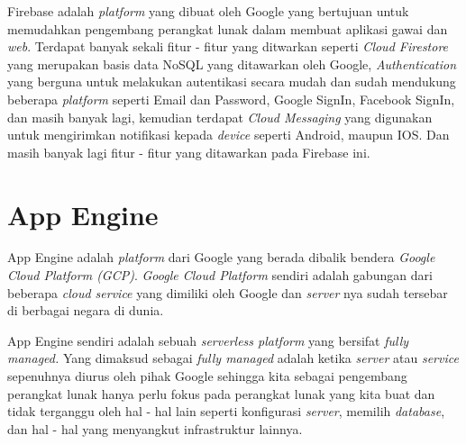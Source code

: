 Firebase adalah \textit{platform} yang dibuat oleh Google yang bertujuan untuk memudahkan pengembang perangkat lunak dalam membuat aplikasi gawai dan \textit{web}. Terdapat banyak sekali fitur - fitur yang ditwarkan seperti \textit{Cloud Firestore} yang merupakan basis data NoSQL yang ditawarkan oleh Google, \textit{Authentication} yang berguna untuk melakukan autentikasi secara mudah dan sudah mendukung beberapa \textit{platform} seperti Email dan Password, Google SignIn, Facebook SignIn, dan masih banyak lagi, kemudian terdapat \textit{Cloud Messaging} yang digunakan untuk mengirimkan notifikasi kepada \textit{device} seperti Android, maupun IOS. Dan masih banyak lagi fitur - fitur yang ditawarkan pada Firebase ini.

\section{App Engine}

App Engine adalah \textit{platform} dari Google yang berada dibalik bendera \textit{Google Cloud Platform (GCP)}. \textit{Google Cloud Platform} sendiri adalah gabungan dari beberapa \textit{cloud service} yang dimiliki oleh Google dan \textit{server} nya sudah tersebar di berbagai negara di dunia.

App Engine sendiri adalah sebuah \textit{serverless platform} yang bersifat \textit{fully managed.} Yang dimaksud sebagai \textit{fully managed} adalah ketika \textit{server} atau \textit{service} sepenuhnya diurus oleh pihak Google sehingga kita sebagai pengembang perangkat lunak hanya perlu fokus pada perangkat lunak yang kita buat dan tidak terganggu oleh hal - hal lain seperti konfigurasi \textit{server}, memilih \textit{database}, dan hal - hal yang menyangkut infrastruktur lainnya.